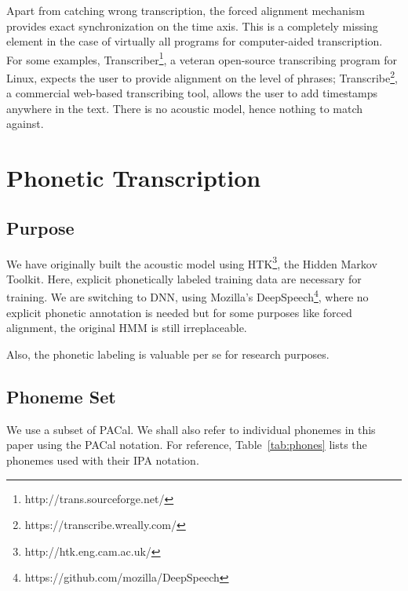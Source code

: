 \documentclass{itatnew}
\begin{document}
Apart from catching wrong transcription, the forced alignment mechanism provides
exact synchronization on the time axis. This is a completely missing element in
the case of virtually all programs for computer-aided transcription. For some
examples, Transcriber\footnote{http://trans.sourceforge.net/}, a veteran
open-source transcribing program for Linux, expects the user to provide
alignment on the level of phrases;
Transcribe\footnote{https://transcribe.wreally.com/}, a commercial web-based
transcribing tool, allows the user to add timestamps anywhere in the text. There
is no acoustic model, hence nothing to match against.

\section{Phonetic Transcription}

\subsection{Purpose}

We have originally built the acoustic model using
HTK\footnote{http://htk.eng.cam.ac.uk/}, the Hidden Markov Toolkit. Here,
explicit phonetically labeled training data are necessary for training. We are
switching to DNN, using Mozilla's
DeepSpeech\footnote{https://github.com/mozilla/DeepSpeech}, where no explicit
phonetic annotation is needed but for some purposes like forced alignment, the
original HMM is still irreplaceable.

Also, the phonetic labeling is valuable per se for research purposes.

\subsection{Phoneme Set}

We use a subset of PACal\cite{nouza1997phonetic}. We shall also refer to
individual phonemes in this paper using the PACal notation. For reference,
Table~\ref{tab:phones} lists the phonemes used with their IPA notation.
\end{document}
